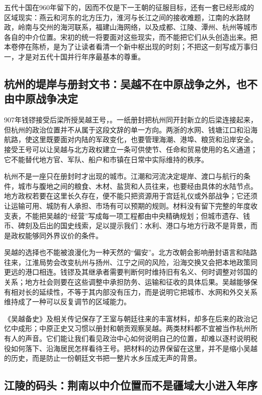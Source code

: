 五代十国在960年留下的，因而不仅是下一王朝的征服目标，还有一套已经形成的区域现实：燕云和河东的北方压力，淮河与长江之间的接收难题，江南的水路财政，岭南与交州的海河联系，福建山海网络，以及成都、江陵、潭州、杭州等城市各自的中介位置。宋初的统一将要面对这些现实，而不能把它们从头创造出来。把本卷停在陈桥，是为了让读者看清一个新中枢出现的时刻；不把这一刻写成万事归一，才是对五代十国并行年序最基本的尊重。

\subsection{杭州的堤岸与册封文书：吴越不在中原战争之外，也不由中原战争决定}

907年钱镠接受后梁所授吴越王号，。一纸册封把杭州同开封新立的后梁连接起来，但杭州的政治位置并不从属于这段文辞的单一方向。两浙的水网、钱塘江口和沿海航路，使这里既要面对内陆的军政变化，也要管理海潮、港埠、粮货和沿岸安全。接受王号可以让吴越与北方政权建立一条可供使节、任命和贸易使用的名义通道；它不能替代地方官、军队、船户和市镇在日常中实际维持的秩序。

杭州不是一座只在册封时才出现的城市。江潮和河流决定堤岸、渡口与航行的条件，城市与腹地之间的粮食、木材、盐货和人员往来，也要经由具体的水陆节点。地方政权若要在这里长久存在，便不能只把资源用于宫廷礼仪或外部战争；它还须让运输可用、城防有人承担、市场有可以预期的规则。材料没有留下完整的年度收支表，不能把吴越的“经营”写成每一项工程都由中央精确规划；但城市遗存、钱币、碑刻及后出的国史线索，足以提示我们：水利、港口与地方行政不是背景，而是政权能够同外界议价的条件。

吴越的选择也不能被浪漫化为一种天然的“偏安”。北方改朝会影响册封语言和陆路往来，江淮局势会改变杭州与扬州、江宁之间的风险，沿海交换又会把本地政策同更远的港口相连。钱镠及其继承者需要判断何时维持旧有名义、何时调整对邻国的关系；地方社会则要在这些调整中承担防务、运输和征收的具体后果。吴越能够保有相对长的延续性，不等于其内部没有压力，而是说明它把城市、水网和外交关系维持成了一种可以反复调节的区域能力。

《吴越备史》及相关传记保存了王室与朝廷往来的丰富材料，却多在后来的政治记忆中成形；中原正史又习惯以册封和朝贡观察吴越。两类材料都不宜被当作杭州所有人的声音。它们能让我们看见政治中心如何说明自己的位置，却难以逐村说明税役如何落下、沿海居民怎样看待王号。把材料的边界保留在这里，并不是缩小吴越的历史，而是防止一份朝廷文书把一整片水乡压成无声的背景。

\subsection{江陵的码头：荆南以中介位置而不是疆域大小进入年序}

